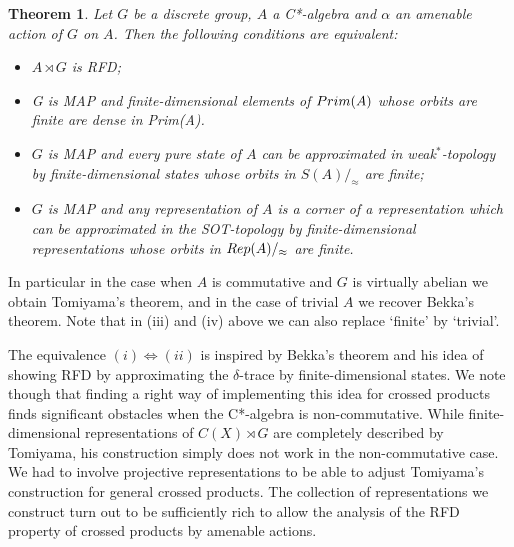 \documentclass[11 pt, leqno, hidelinks]{amsart}%
\theoremstyle{plain}
\newtheorem{thmx}{Theorem}
\numberwithin{equation}{section}
\newcommand{\Rep}{\textup{Rep}}
\newcommand{\Prim}{\textup{Prim}}
\begin{document}
\begin{thmx} \label{thm:A} Let $G$ be a discrete  group, $A$ a C*-algebra and $\alpha$ an amenable action of $G$ on $A$. Then the following conditions are equivalent:
	\begin{itemize}
		\item [(i)] $A\rtimes G$ is RFD;
				\item[(ii)] G is MAP and finite-dimensional elements of $\Prim(A)$ whose orbits are finite are dense in Prim(A).
		\item[(iii)] $G$ is MAP and every pure state of $A$ can be approximated in weak$^*$-topology by finite-dimensional  states whose orbits in $S(A)/_\approx$ are finite;
\item[(iv)] $G$ is MAP and any representation of $A$ is a corner of a representation which can be approximated in the SOT-topology by finite-dimensional representations whose orbits in $\Rep(A)/_\approx$ are finite.
	\end{itemize}
\end{thmx}

In particular in the case when $A$ is commutative and $G$ is virtually abelian we obtain Tomiyama's theorem, and in the case of trivial $A$ we recover Bekka's theorem. Note that in (iii) and (iv) above we can also replace `finite' by `trivial'.

The equivalence $(i)\Leftrightarrow (ii)$ is inspired by Bekka's theorem and his idea of showing RFD by approximating the $\delta$-trace by finite-dimensional states. We note though that finding a right way of implementing this idea for crossed products finds significant obstacles when the C*-algebra is non-commutative. While finite-dimensional representations of $C(X)\rtimes G$ are completely described by Tomiyama, his construction simply does not work in the non-commutative case. We had to involve projective representations to be able to adjust Tomiyama's construction for general crossed products. The collection of representations we construct turn out to be sufficiently rich to allow the analysis of  the RFD property of crossed products by amenable actions.
\end{document}
